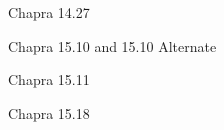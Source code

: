 \documentclass{article}
\begin{document}
\begin{figure}[htb!]
\begin{center}
\caption{Chapra 14.27}
\end{center}
\end{figure}


\begin{figure}[htb!]
\begin{center}
\caption{Chapra 15.10 and 15.10 Alternate}
\end{center}
\end{figure}

\begin{figure}[htb!]
\begin{center}
\caption{Chapra 15.11}
\end{center}
\end{figure}

\begin{figure}[htb!]
\begin{center}
\caption{Chapra 15.18}
\end{center}
\end{figure}
\end{document}
